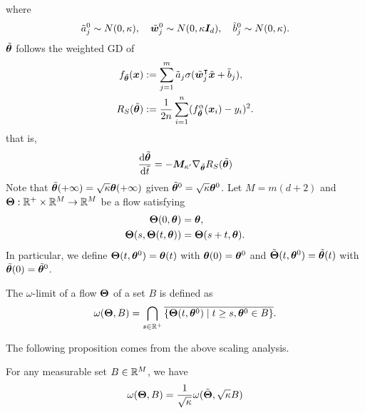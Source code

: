 \documentclass{article}
\begin{document}
where
\begin{equation}
    \tilde{a}^0_j\sim N(0, \kappa), \quad \tilde{\bm{w}}_j^0\sim N(0, \kappa\bm{I}_d), \quad \tilde{b}^0_j\sim N(0, \kappa).
\end{equation}
$\tilde{\bm{\theta}}$ follows the weighted GD of
\begin{align}
    f_{\tilde{\bm{\theta}}}(\bm{x})
     & := \sum_{j=1}^{m}\tilde{a}_j\sigma(\tilde{\bm{w}}_j^\intercal\tilde{\bm{x}}+\tilde{b}_j), \\
    R_S(\tilde{\bm{\theta}})
     & :=\frac{1}{2n}\sum_{i=1}^n(f_{\tilde{\bm{\theta}}}^\alpha(\bm{x}_i)-y_i)^2.
\end{align}
that is,
\begin{equation}
    \frac{\mathrm{d} \tilde{\bm{\theta}}}{\mathrm{d}\tilde{t}} = -\bm{M}_{\kappa'}\nabla_{\tilde{\bm{\theta}}}R_S(\tilde{\bm{\theta}})
\end{equation}
Note that $\tilde{\bm{\theta}}(+\infty)=\sqrt{\kappa}\bm{\theta}(+\infty)$ given $\tilde{\bm{\theta}}^0=\sqrt{\kappa}\bm{\theta}^0$. Let $M=m(d+2)$ and $\bm{\Theta}:\mathbb{R}^+\times\mathbb{R}^M\to\mathbb{R}^M$ be a flow satisfying
\begin{align}
    \bm{\Theta}(0,\bm{\theta})
     & = \bm{\theta},              \\
    \bm{\Theta}(s,\bm{\Theta}(t,\bm{\theta}))
     & = \bm{\Theta}(s+t,\bm{\theta}).
\end{align}
In particular, we define $\bm{\Theta}(t,\bm{\theta}^0)=\bm{\theta}(t)$ with $\bm{\theta}(0)=\bm{\theta}^0$ and $\tilde{\bm{\Theta}}(t,\bm{\theta}^0)=\tilde{\bm{\theta}}(t)$ with $\tilde{\bm{\theta}}(0)=\tilde{\bm{\theta}}^0$.
\begin{defi}
    The $\omega$-limit of a flow $\bm{\Theta}$ of a set $B$ is defined as
    \begin{equation}
        \omega(\bm{\Theta},B)=\bigcap_{s\in\mathbb{R}^+}\overline{\left\{\bm{\Theta}(t,\bm{\theta}^0)\mid t\geq s, \bm{\theta}^0\in B\right\}}.
    \end{equation}
\end{defi}
The following proposition comes from the above scaling analysis.
\begin{prop}
    For any measurable set $B\in \mathbb{R}^M$, we have
    \begin{equation}
        \omega(\bm{\Theta},B)=\frac{1}{\sqrt{\kappa}}\omega(\tilde{\bm{\Theta}},\sqrt{\kappa}B)
    \end{equation}
\end{prop}
\end{document}
